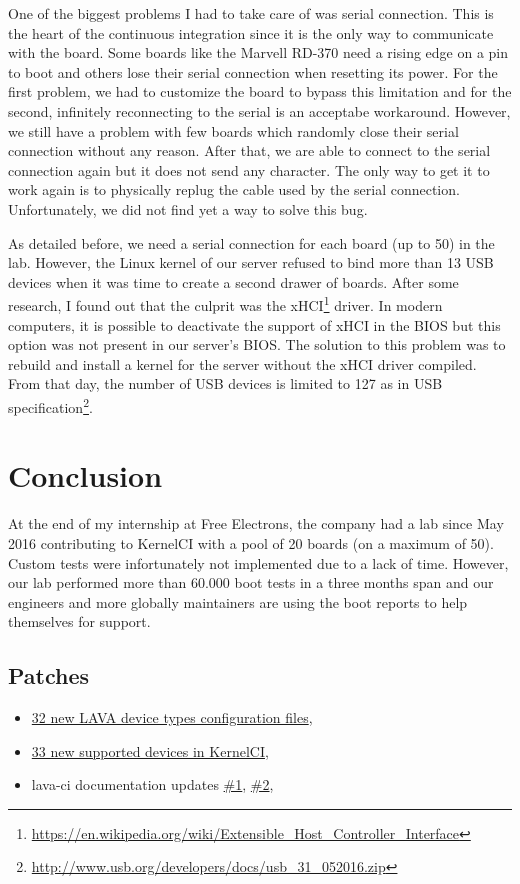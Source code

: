 One of the biggest problems I had to take care of was serial connection. This is the heart of the continuous integration since it is the only way to communicate with the board. Some boards like the Marvell RD-370 need a rising edge on a pin to boot and others lose their serial connection when resetting its power. For the first problem, we had to customize the board to bypass this limitation and for the second, infinitely reconnecting to the serial is an acceptabe workaround. However, we still have a problem with few boards which randomly close their serial connection without any reason. After that, we are able to connect to the serial connection again but it does not send any character. The only way to get it to work again is to physically replug the cable used by the serial connection. Unfortunately, we did not find yet a way to solve this bug.

As detailed before, we need a serial connection for each board (up to 50) in the lab. However, the Linux kernel of our server refused to bind more than 13 USB devices when it was time to create a second drawer of boards. After some research, I found out that the culprit was the xHCI\footnote{\url{https://en.wikipedia.org/wiki/Extensible\_Host\_Controller\_Interface}} driver. In modern computers, it is possible to deactivate the support of xHCI in the BIOS but this option was not present in our server's BIOS. The solution to this problem was to rebuild and install a kernel for the server without the xHCI driver compiled. From that day, the number of USB devices is limited to 127 as in USB specification\footnote{\url{http://www.usb.org/developers/docs/usb\_31\_052016.zip}}.

\section{Conclusion}
At the end of my internship at Free Electrons, the company had a lab since May 2016 contributing to KernelCI with a pool of 20 boards (on a maximum of 50). Custom tests were infortunately not implemented due to a lack of time. However, our lab performed more than 60.000 boot tests in a three months span and our engineers and more globally maintainers are using the boot reports to help themselves for support.


\subsection{Patches}

\begin{itemize}
  \item \href{https://review.linaro.org/#/q/Quentin\%20Schulz}{32 new LAVA device types configuration files},
  \item \href{https://github.com/kernelci/lava-ci/commits/master?author=quentin.schulz\%40free-electrons.com&page=1}{33 new supported devices in KernelCI},
  \item lava-ci documentation updates \href{https://github.com/kernelci/lava-ci/commit/058e9a72a752c9851c16a96aa51beafc9ce80128}{\#1}, \href{https://github.com/kernelci/lava-ci/pull/56}{\#2},
\end{itemize}
